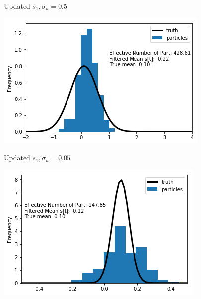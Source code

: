 \documentclass[presentation]{beamer}
\begin{document}
\begin{frame}[label={sec:org4ddba60}]{Updated \(s_1, \sigma_u = 0.5\)}
\begin{center}
\includegraphics[width=.9\linewidth]{updated2big.png}
\end{center}
\end{frame}

\begin{frame}[label={sec:org0824345}]{Updated \(s_1, \sigma_u = 0.05\)}
\begin{center}
\includegraphics[width=.9\linewidth]{updated2small.png}
\end{center}
\end{frame}
\end{document}
